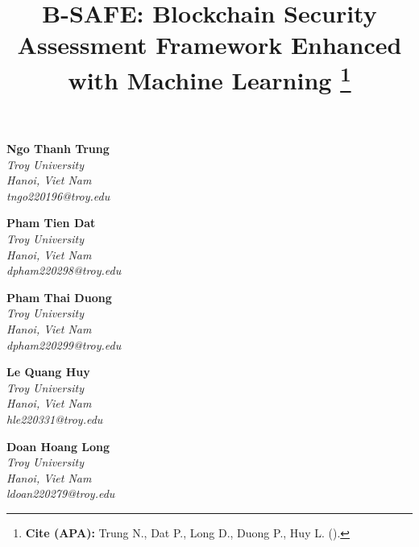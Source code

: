 \documentclass[a4paper]{article}
\title{
    \textbf{B-SAFE: Blockchain Security Assessment Framework Enhanced with Machine Learning} 
    \thanks{
        \sloppy
        \textbf{Cite (APA):} Trung N., Dat P., Long D., Duong P., Huy L. (\the\year).
    }
}
\date{} %
\begin{document}
\maketitle
\vspace{-1.5cm}

\begin{multicols}{3}
    \centering
    \textbf{Ngo Thanh Trung}\\
    \textit{Troy University}\\
    \textit{Hanoi, Viet Nam}\\
    \textit{tngo220196@troy.edu}
	\vfill

    \textbf{Pham Tien Dat}\\
    \textit{Troy University}\\
    \textit{Hanoi, Viet Nam}\\
    \textit{dpham220298@troy.edu}
	\vfill

    \columnbreak

    \textbf{Pham Thai Duong}\\
    \textit{Troy University}\\
    \textit{Hanoi, Viet Nam}\\
    \textit{dpham220299@troy.edu}
	\vfill

    \textbf{Le Quang Huy}\\
    \textit{Troy University}\\
    \textit{Hanoi, Viet Nam}\\
    \textit{hle220331@troy.edu}
	\vfill

    \columnbreak

    \textbf{Doan Hoang Long}\\
    \textit{Troy University}\\
    \textit{Hanoi, Viet Nam}\\
    \textit{ldoan220279@troy.edu}
	\vfill
\end{multicols}

\singlespacing
\setlength{\parskip}{6pt}
\setlength{\parindent}{0.5cm}

\end{document}
